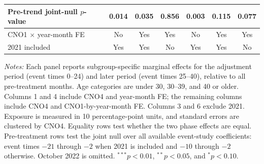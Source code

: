 \begin{table}[p]
\begin{threeparttable}
\begin{tabular}{@{}lcccccc@{}}
Pre-trend joint-null $p$-value & 0.014 & 0.035 & 0.856 & 0.003 & 0.115 & 0.077 \\
\midrule
CNO1 $\times$ year-month FE & No & Yes & Yes & No & Yes & Yes \\
2021 included & Yes & Yes & No & Yes & Yes & No \\
\bottomrule
\end{tabular}
\begin{tablenotes}[flushleft]
\scriptsize
\item \emph{Notes:} Each panel reports subgroup-specific marginal effects for the adjustment period (event times 0--24) and later period (event times 25--40), relative to all pre-treatment months. Age categories are under 30, 30--39, and 40 or older. Columns 1 and 4 include CNO4 and year-month FE; the remaining columns include CNO4 and CNO1-by-year-month FE. Columns 3 and 6 exclude 2021. Exposure is measured in 10 percentage-point units, and standard errors are clustered by CNO4. Equality rows test whether the two phase effects are equal. Pre-treatment rows test the joint null over all available event-study coefficients: event times $-21$ through $-2$ when 2021 is included and $-10$ through $-2$ otherwise. October 2022 is omitted. $^{***}p<0.01$, $^{**}p<0.05$, and $^{*}p<0.10$.
\end{tablenotes}
\end{threeparttable}
\end{table}
